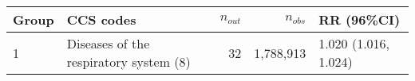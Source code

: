 \begin{tabular}{lp{6.5cm}rrp{2.2cm}}
  \hline
Group & CCS codes & $n_{out}$ & $n_{obs}$ & RR (96\%CI) \\ 
  \hline
   1 & Diseases of the respiratory system (8) &   32 & 1,788,913 & 1.020 (1.016, 1.024) \\ 
   \hline
\end{tabular}

